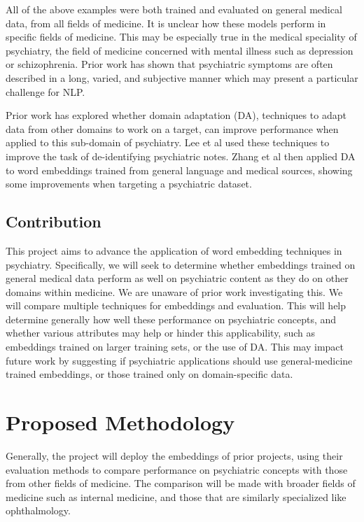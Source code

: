 \documentclass[10pt]{article}
\begin{document}
All of the above examples were both trained and evaluated on general medical data, from all fields of medicine. It is unclear how these models perform in specific fields of medicine. This may be especially true in the medical speciality of psychiatry, the field of medicine concerned with mental illness such as depression or schizophrenia. Prior work has shown that psychiatric symptoms are often described in a long, varied, and subjective manner \cite{forbushSittingPinsNeedles2013} which may present a particular challenge for NLP.

Prior work has explored whether domain adaptation (DA), techniques to adapt data from other domains to work on a target, can improve performance when applied to this sub-domain of psychiatry. Lee et al \cite{leeLeveragingExistingCorpora2018} used these techniques to improve the task of de-identifying psychiatric notes. Zhang et al \cite{zhangAdaptingWordEmbeddings2018} then applied DA to word embeddings trained from general language and medical sources, showing some improvements when targeting a psychiatric dataset. 

\subsection{Contribution}

This project aims to advance the application of word embedding techniques in psychiatry. Specifically, we will seek to  determine whether embeddings trained on general medical data perform as well on psychiatric content as they do on other domains within medicine. We are unaware of prior work investigating this. We will compare multiple techniques for embeddings and evaluation. This will help determine generally how well these performance on psychiatric concepts, and whether various attributes may help or hinder this applicability, such as embeddings trained on larger training sets, or the use of DA.  This may impact future work by suggesting if psychiatric applications should use general-medicine trained embeddings, or those trained only on domain-specific data.  


\section{Proposed Methodology}

Generally, the project will deploy the embeddings of prior projects, using their evaluation methods to compare performance on psychiatric concepts with those from other fields of medicine. The comparison will be made with broader fields of medicine such as internal medicine, and those that are similarly specialized like ophthalmology. 
\end{document}
